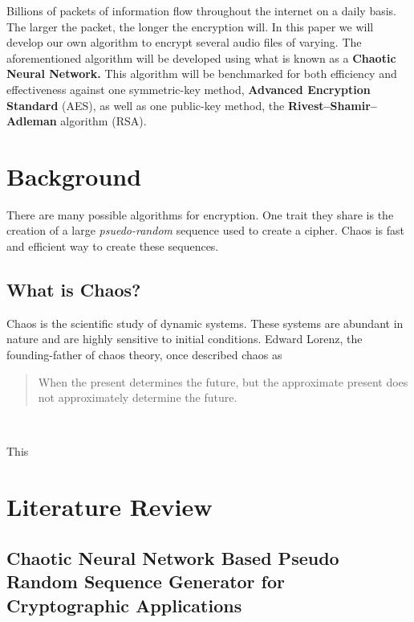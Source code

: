 \documentclass[conference]{IEEEtran}
\begin{document}
Billions of packets of information flow throughout the internet on a daily basis.
The larger the packet, the longer the encryption will.
In this paper we will develop our own algorithm to encrypt several audio files of varying.
The aforementioned algorithm will be developed using what is known as a \textbf{Chaotic Neural Network.}
This algorithm will be benchmarked for both efficiency and effectiveness against one symmetric-key method, \textbf{Advanced Encryption Standard} (AES), as well as one public-key method, the \textbf{Rivest–Shamir–Adleman} algorithm (RSA).


\section{Background}\label{sec:background}

There are many possible algorithms for encryption.
One trait they share is the creation of a large \textit{psuedo-random} sequence used to create a cipher.
Chaos is fast and efficient way to create these sequences.

\subsection{What is Chaos?}\label{subsec:what-is-chaos?}

Chaos is the scientific study of dynamic systems.
These systems are abundant in nature and are highly sensitive to initial conditions.
Edward Lorenz, the founding-father of chaos theory, once described chaos as

\begin{framed}
    \begin{quote}
        When the present determines the future, but the approximate present does not approximately determine the future.
    \end{quote}
    ~\cite{Alligood}
\end{framed}


This

\section{Literature Review}\label{sec:literature-review}

\subsection*{\textbf{Chaotic Neural Network Based Pseudo Random Sequence Generator for Cryptographic Applications}}\label{subsec:chaotic-neural-network-based-pseudo-random-sequence-generator-for-cryptographic-applications}\cite{Lokesh}
\end{document}
